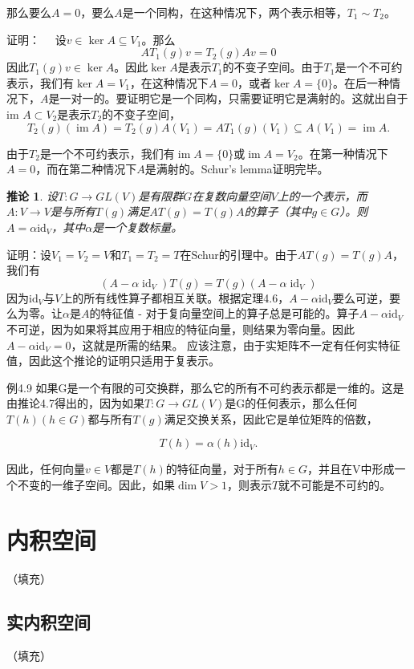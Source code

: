\documentclass[hyperref,UTF8]{ctexbook}
\newtheorem{corollary}[theorem]{推论}
\begin{document}
那么要么$A=0$，要么$A$是一个同构，在这种情况下，两个表示相等，$T_1 \sim T_2$。

证明：$\quad$ 设$v \in \operatorname{ker} A \subseteq V_1$。那么
$$
A T_1(g) v=T_2(g) A v=0
$$
因此$T_1(g) v \in \operatorname{ker} A$。因此$\operatorname{ker} A$是表示$T_1$的不变子空间。由于$T_1$是一个不可约表示，我们有$\operatorname{ker} A=V_1$，在这种情况下$A=0$，或者$\operatorname{ker} A=\{0\}$。在后一种情况下，$A$是一对一的。要证明它是一个同构，只需要证明它是满射的。这就出自于im $A \subset V_2$是表示$T_2$的不变子空间，
$$
T_2(g)(\operatorname{im} A)=T_2(g) A\left(V_1\right)=A T_1(g)\left(V_1\right) \subseteq A\left(V_1\right)=\operatorname{im} A .
$$

由于$T_2$是一个不可约表示，我们有$\operatorname{im} A=\{0\}$或$\operatorname{im} A=V_2$。在第一种情况下$A=0$，而在第二种情况下$A$是满射的。Schur's lemma证明完毕。

\begin{corollary}
    设$T: G \rightarrow G L(V)$是有限群$G$在复数向量空间$V$上的一个表示，而$A: V \rightarrow V$是与所有$T(g)$满足$A T(g)=T(g) A$的算子（其中$g \in G$）。则$A=\alpha \mathrm{id}_V$，其中$\alpha$是一个复数标量。
\end{corollary}
证明：设$V_1=V_2=V$和$T_1=T_2=T$在Schur的引理中。由于$A T(g)=T(g) A$，我们有
$$
\left(A-\alpha \operatorname{id}_V\right) T(g)=T(g)\left(A-\alpha \operatorname{id}_V\right)
$$
因为$\mathrm{id}_V$与$V$上的所有线性算子都相互关联。根据定理4.6，$A-\alpha \mathrm{id}_V$要么可逆，要么为零。让$\alpha$是$A$的特征值 - 对于复向量空间上的算子总是可能的。算子$A-\alpha \mathrm{id}_V$不可逆，因为如果将其应用于相应的特征向量，则结果为零向量。因此$A-\alpha \mathrm{id}_V=0$，这就是所需的结果。
应该注意，由于实矩阵不一定有任何实特征值，因此这个推论的证明只适用于复表示。

例4.9 如果G是一个有限的可交换群，那么它的所有不可约表示都是一维的。这是由推论4.7得出的，因为如果$T:G\to GL(V)$是G的任何表示，那么任何$T(h)(h\in G)$都与所有$T(g)$满足交换关系，因此它是单位矩阵的倍数，

$$
T(h)=\alpha(h)\mathrm{id}_V.
$$

因此，任何向量$v\in V$都是$T(h)$的特征向量，对于所有$h\in G$，并且在V中形成一个不变的一维子空间。因此，如果$\dim V>1$，则表示$T$就不可能是不可约的。
\chapter{内积空间}（填充）
\section{实内积空间}（填充）
\end{document}
